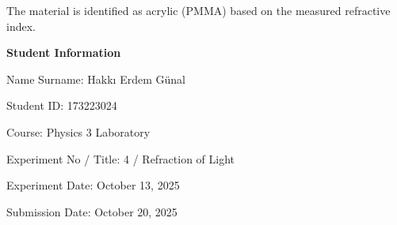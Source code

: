 \documentclass[12pt, a4paper]{article}
\begin{document}
The material is identified as acrylic (PMMA) based on the measured refractive index.

\newpage

\textbf{Student Information}

Name Surname: Hakkı Erdem Günal

Student ID: 173223024

Course: Physics 3 Laboratory

Experiment No / Title: 4 / Refraction of Light

Experiment Date: October 13, 2025

Submission Date: October 20, 2025
\end{document}
